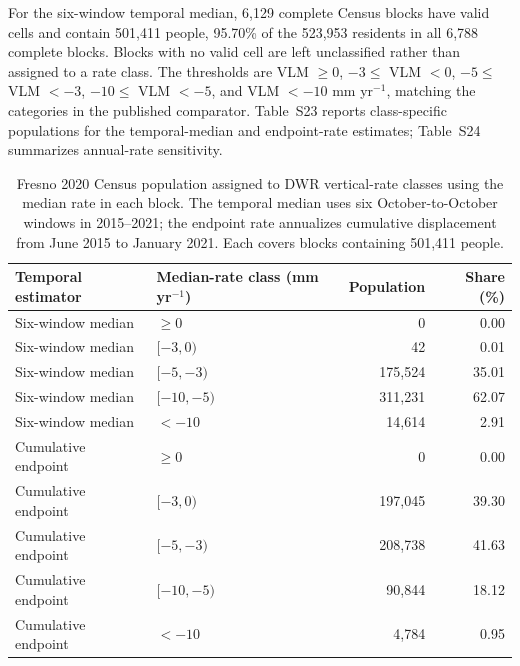 \documentclass[10pt,a4paper]{article}
\begin{document}
For the six-window temporal median, 6,129 complete Census blocks have valid cells and contain 501,411 people, 95.70\% of the 523,953 residents in all 6,788 complete blocks. Blocks with no valid cell are left unclassified rather than assigned to a rate class. The thresholds are VLM $\geq 0$, $-3\leq$ VLM $<0$, $-5\leq$ VLM $<-3$, $-10\leq$ VLM $<-5$, and VLM $<-10$ mm yr$^{-1}$, matching the categories in the published comparator. Table~S23 reports class-specific populations for the temporal-median and endpoint-rate estimates; Table~S24 summarizes annual-rate sensitivity.

\begin{table}[htbp]\centering\small
\caption{Fresno 2020 Census population assigned to DWR vertical-rate classes using the median rate in each block. The temporal median uses six October-to-October windows in 2015--2021; the endpoint rate annualizes cumulative displacement from June 2015 to January 2021. Each covers blocks containing 501,411 people.}
\begin{tabular}{p{.28\linewidth}p{.38\linewidth}rr}\toprule
Temporal estimator & Median-rate class (mm yr$^{-1}$) & Population & Share (\%) \\\midrule
Six-window median & $\geq0$ & 0 & 0.00 \\
Six-window median & $[-3,0)$ & 42 & 0.01 \\
Six-window median & $[-5,-3)$ & 175,524 & 35.01 \\
Six-window median & $[-10,-5)$ & 311,231 & 62.07 \\
Six-window median & $<-10$ & 14,614 & 2.91 \\
Cumulative endpoint & $\geq0$ & 0 & 0.00 \\
Cumulative endpoint & $[-3,0)$ & 197,045 & 39.30 \\
Cumulative endpoint & $[-5,-3)$ & 208,738 & 41.63 \\
Cumulative endpoint & $[-10,-5)$ & 90,844 & 18.12 \\
Cumulative endpoint & $<-10$ & 4,784 & 0.95 \\
\bottomrule\end{tabular}
\end{table}
\end{document}

